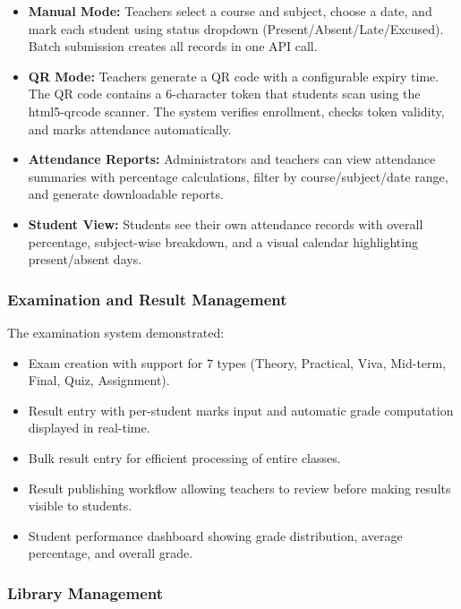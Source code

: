 \begin{itemize}[leftmargin=2em]
    \item \textbf{Manual Mode:} Teachers select a course and subject, choose a date, and mark each student using status dropdown (Present/Absent/Late/Excused). Batch submission creates all records in one API call.
    \item \textbf{QR Mode:} Teachers generate a QR code with a configurable expiry time. The QR code contains a 6-character token that students scan using the html5-qrcode scanner. The system verifies enrollment, checks token validity, and marks attendance automatically.
    \item \textbf{Attendance Reports:} Administrators and teachers can view attendance summaries with percentage calculations, filter by course/subject/date range, and generate downloadable reports.
    \item \textbf{Student View:} Students see their own attendance records with overall percentage, subject-wise breakdown, and a visual calendar highlighting present/absent days.
\end{itemize}

\subsubsection{Examination and Result Management}

The examination system demonstrated:

\begin{itemize}[leftmargin=2em]
    \item Exam creation with support for 7 types (Theory, Practical, Viva, Mid-term, Final, Quiz, Assignment).
    \item Result entry with per-student marks input and automatic grade computation displayed in real-time.
    \item Bulk result entry for efficient processing of entire classes.
    \item Result publishing workflow allowing teachers to review before making results visible to students.
    \item Student performance dashboard showing grade distribution, average percentage, and overall grade.
\end{itemize}

\subsubsection{Library Management}

